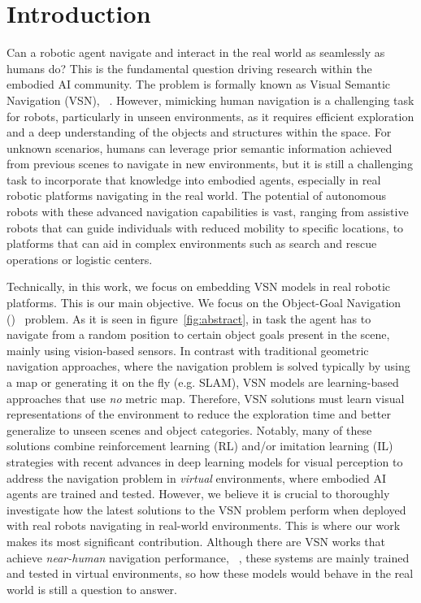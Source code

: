 

\section{Introduction}\label{sec:introduction}

Can a robotic agent navigate and interact in the real world as seamlessly as humans do?
This is the fundamental question driving research within the embodied AI community.
The problem is formally known as Visual Semantic Navigation (VSN), \eg~\cite{ramrakhya2023,Cai2024DGMemLV,chang2020}.
However, mimicking human navigation is a challenging task for robots, particularly in unseen environments, as it requires efficient exploration and a deep understanding of the objects and structures within the space.
For unknown scenarios, humans can leverage prior semantic information achieved from previous scenes to navigate in new environments, but it is still a challenging task to incorporate that knowledge into embodied agents, especially in real robotic platforms navigating in the real world.
The potential of autonomous robots with these advanced navigation capabilities is vast, ranging from assistive robots that can guide individuals with reduced mobility to specific locations, to platforms that can aid in complex environments such as search and rescue operations or logistic centers.

Technically, in this work, we focus on embedding VSN models in real robotic platforms.
This is our main objective.
We focus on the Object-Goal Navigation (\objnav)~\cite{batra2020} problem.
As it is seen in figure~\ref{fig:abstract}, in \objnav task the agent has to navigate from a random position to certain object goals present in the scene, mainly using vision-based sensors.
In contrast with traditional geometric navigation approaches, where the navigation problem is solved typically by using a map or generating it on the fly (e.g. SLAM), VSN models are learning-based approaches that use \emph{no} metric map.
Therefore, VSN solutions must learn visual representations of the environment to reduce the exploration time and better generalize to unseen scenes and object categories.
Notably, many of these solutions combine reinforcement learning (RL) and/or imitation learning (IL) strategies with recent advances in deep learning models for visual perception to address the navigation problem in \emph{virtual} environments, where embodied AI agents are trained and tested.
However, we believe it is crucial to thoroughly investigate how the latest solutions to the VSN problem perform when deployed with real robots navigating in real-world environments.
This is where our work makes its most significant contribution.
Although there are VSN works that achieve \textit{near-human} navigation performance, \eg~\cite{ramrakhya2023}, these systems are mainly trained and tested in virtual environments, so how these models would behave in the real world is still a question to answer.

